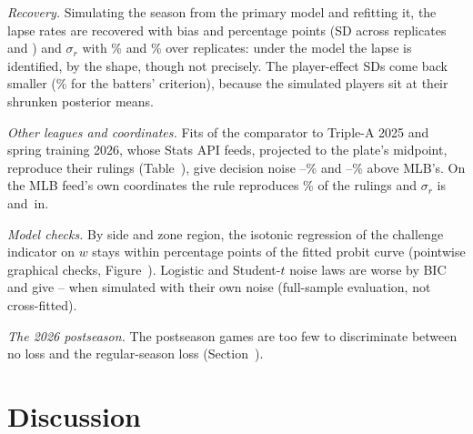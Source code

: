 \documentclass[aoas]{imsart}
\theoremstyle{plain}
\theoremstyle{definition}
\begin{document}
\emph{Recovery.} Simulating the season from the primary model and refitting it, the lapse rates are recovered with bias \RecPLapseBatter{} and \RecPLapseCatcher{} percentage points (SD across
replicates \RecPLapseSDBatter{} and \RecPLapseSDCatcher) and $\sigma_r$ with \RecPSrBatter\% and \RecPSrCatcher\% over
\RecPN{} replicates: under the model the lapse is identified, by the shape, though not precisely. The player-effect SDs
come back smaller (\RecPSdKBatter\% for the batters' criterion), because the simulated players sit at their shrunken
posterior means.

\emph{Other leagues and coordinates.} Fits of the comparator to Triple-A 2025 and spring training 2026, whose Stats API feeds, projected to the plate's
midpoint, reproduce their rulings (Table~), give decision noise \AAASrPctLo--\AAASrPctHi\% and
\SpringSrPctLo--\SpringSrPctHi\% above MLB's. On the MLB feed's own coordinates the rule reproduces \GeomReproFeed\% of
the rulings and $\sigma_r$ is \FeedSrBatter{} and \FeedSrCatcher\,in.

\emph{Model checks.} By side and zone region, the isotonic regression of the challenge indicator on $w$ stays within
\IsoMaxGap{} percentage points of the fitted probit curve (pointwise graphical checks, Figure~).
Logistic and Student-$t$ noise laws are worse by BIC and give \SpreadRejLo--\SpreadRejHi{} when simulated with their
own noise (full-sample evaluation, not cross-fitted).

\begin{table}[t]
\caption{Out-of-sample and external-league checks of the homogeneous comparator. Overturn rate: among the pitches the model would
have challenged, against the observed rate among the challenges made.}\label{tab:oos}
\centering\small

\end{table}

\emph{The 2026 postseason.} The \PostGames{} postseason games are too few to discriminate between no loss and the
regular-season loss (Section~).

\section{Discussion}\label{sec:discussion}
\end{document}
